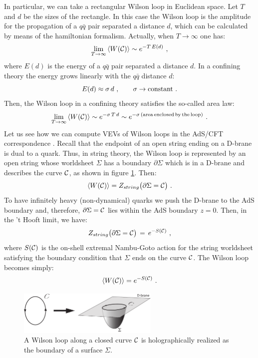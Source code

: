 \documentclass[12pt,notitlepage]{article}
\newcommand{\beq}{\begin{equation}}
\newcommand{\eeq}{\end{equation}}
\begin{document}
In particular, we can take a rectangular Wilson loop in Euclidean space.  Let $T$ and $d$ be the sizes of the rectangle. In this case the Wilson loop is the amplitude for the propagation of a $q\bar q$ pair separated a distance $d$, which can be calculated by means of the hamiltonian formalism. Actually, when $T\to\infty$ one has:
\beq
\lim_{T\to\infty}\,\langle W({\cal C})\rangle\sim e^{-T\,E(d)}\,\,,
\eeq
where $E(d)$ is the energy of a $q\bar q$ pair separated a distance $d$. 
In a confining theory the energy grows linearly with the $q\bar q$ distance $d$:
\beq
E(d)\approx \sigma\, d\,\,,
\qquad
\sigma\to {\rm constant}\,\,.
\eeq
Then, the Wilson loop in a confining theory satisfies the so-called area law:
\beq
\lim_{T\to\infty}\,\langle W({\cal C})\rangle\sim e^{-\sigma\,T\,d}\sim 
e^{-\sigma\,({\rm area \,enclosed\, by \,the\, loop})}\,\,.
\eeq
Let us see how we can compute  VEVs of Wilson loops in the AdS/CFT correspondence \cite{Maldacena:1998im,Rey:1998ik}. Recall that the endpoint of an open string ending on a D-brane is dual to a quark. Thus, in string theory, the Wilson loop is represented by an open string whose worldsheet  $\Sigma$ has a boundary $\partial\Sigma$ which is in a D-brane and describes the curve ${\cal C}$, as shown in figure \ref{holoWilson}. Then:
\beq
\langle W({\cal C})\rangle=Z_{string} \big(\partial\Sigma={\cal C}\big)\,\,.
\eeq
To have infinitely heavy (non-dynamical) quarks we push the D-brane to the AdS boundary and, therefore, $\partial\Sigma={\cal C}$ lies within the AdS boundary $z=0$. Then,  in the 't Hooft limit, we have:
\beq
Z_{string} \big(\partial\Sigma={\cal C}\big)\,=\,e^{-S({\cal C})}\,\,,
\eeq
where $S({\cal C})$ is the on-shell extremal Nambu-Goto action for the string worldsheet satisfying the boundary condition that $\Sigma$  ends on the curve ${\cal C}$. The Wilson loop becomes simply:
\beq
\langle W({\cal C})\rangle=e^{-S({\cal C})}\,\,.
\eeq

\begin{figure}[ht]
\center
\includegraphics[width=0.6\textwidth]{WilsonLoop.pdf}
\qquad
\caption{A Wilson loop along a closed curve ${\cal C}$ is holographically realized as the boundary of a surface $\Sigma$.  } 
\label{holoWilson}
\end{figure}
\end{document}
